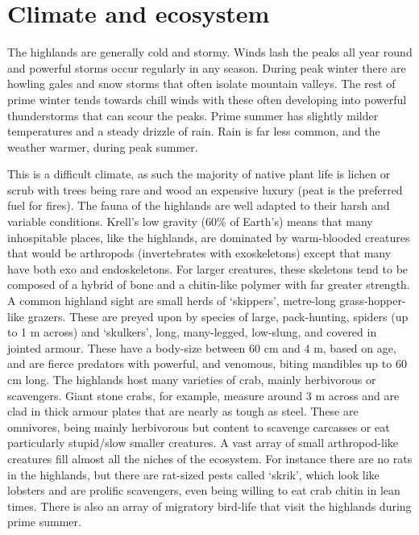 \documentclass[a4paper,11pt,oneside]{book}
\begin{document}
\section{Climate and ecosystem}
The highlands are generally cold and stormy. Winds lash the peaks all year round and powerful storms occur regularly in any season. During peak winter there are howling gales and snow storms that often isolate mountain valleys. The rest of prime winter tends towards chill winds with these often developing into powerful thunderstorms that can scour the peaks. Prime summer has slightly milder temperatures and a steady drizzle of rain. Rain is far less common, and the weather warmer, during peak summer. 

This is a difficult climate, as such the majority of native plant life is lichen or scrub with trees being rare and wood an expensive luxury (peat is the preferred fuel for fires). The fauna of the highlands are well adapted to their harsh and variable conditions. Krell's low gravity (60\% of Earth's) means that many inhospitable places, like the highlands, are dominated by warm-blooded creatures that would be arthropods (invertebrates with exoskeletons) except that many have both exo and endoskeletons. For larger creatures, these skeletons tend to be composed of a hybrid of bone and a chitin-like polymer with far greater strength. A common highland sight are small herds of `skippers', metre-long grass-hopper-like grazers. These are preyed upon by species of large, pack-hunting, spiders (up to 1 m across) and `skulkers', long, many-legged, low-slung, and covered in jointed armour. These have a body-size between 60 cm and 4 m, based on age, and are fierce predators with powerful, and venomous, biting mandibles up to 60 cm long. The highlands host many varieties of crab, mainly herbivorous or scavengers. Giant stone crabs, for example, measure around 3 m across and are clad in thick armour plates that are nearly as tough as steel. These are omnivores, being mainly herbivorous but content to scavenge carcasses or eat particularly stupid/slow smaller creatures. A vast array of small arthropod-like creatures fill almost all the niches of the ecosystem. For instance there are no rats in the highlands, but there are rat-sized pests called `skrik', which look like lobsters and are prolific scavengers, even being willing to eat crab chitin in lean times. There is also an array of migratory bird-life that visit the highlands during prime summer. 
\end{document}
